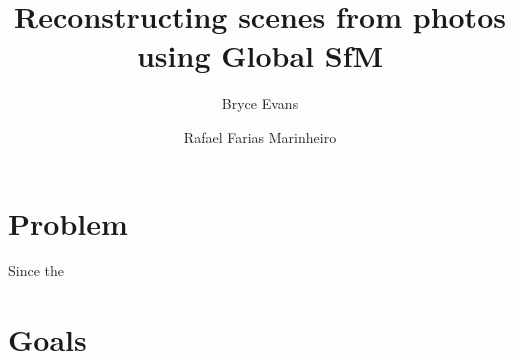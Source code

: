 \documentclass[conference, 12pt]{acmsiggraph}
\title{Reconstructing scenes from photos using Global SfM}
\author{Bryce Evans \and Rafael Farias Marinheiro}
\affiliation{Cornell University\thanks{\{bae43, rf356\}@cornell.edu}}
\begin{document}

\maketitle












\section{Problem}

Since the


\section{Goals}
\end{document}
